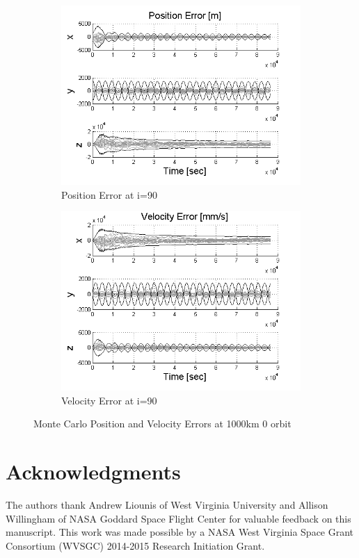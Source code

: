 \documentclass[]{aiaa-tc}%
\begin{document}
\begin{figure}[ht!]
\centering
\begin{subfigure}{.5\textwidth}
  \centering
  \includegraphics[width=0.9\linewidth]{MC_pos0}
  \caption{Position Error at i=90\degree}
  \label{fig:mcpos0}
\end{subfigure}%
\begin{subfigure}{.5\textwidth} 
  \centering
  \includegraphics[width=0.9\linewidth]{MC_vel0}
  \caption{Velocity Error at i=90\degree}
  \label{fig:coastline}
\end{subfigure}
\caption{Monte Carlo Position and Velocity Errors at 1000km 0 \degree orbit}
\label{fig:mcvel0}
\end{figure}

\section{Acknowledgments}
The authors thank Andrew Liounis of West Virginia University and Allison Willingham of NASA Goddard Space Flight Center for valuable feedback on this manuscript. This work was made possible by a NASA West Virginia Space Grant Consortium (WVSGC) 2014-2015 Research Initiation Grant. 



\end{document}

